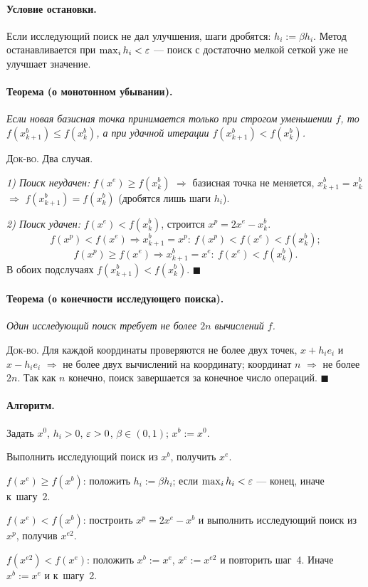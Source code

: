 \paragraph{Условие остановки.}
Если исследующий поиск не дал улучшения, шаги дробятся: $h_i := \beta h_i$.
Метод останавливается при $\max_i h_i < \varepsilon$ — поиск с достаточно мелкой
сеткой уже не улучшает значение.

\paragraph{Теорема (о монотонном убывании).}
\textit{Если новая базисная точка принимается только при строгом уменьшении
$f$, то $f(x^b_{k+1}) \le f(x^b_k)$, а при удачной итерации
$f(x^b_{k+1}) < f(x^b_k)$.}

\textsc{Док-во.} Два случая.

\emph{1) Поиск неудачен:} $f(x^e) \ge f(x^b_k)$ $\Rightarrow$ базисная точка
не меняется, $x^b_{k+1} = x^b_k$ $\Rightarrow$ $f(x^b_{k+1}) = f(x^b_k)$
(дробятся лишь шаги $h_i$).

\emph{2) Поиск удачен:} $f(x^e) < f(x^b_k)$, строится $x^p = 2x^e - x^b_k$.
\[
  f(x^p) < f(x^e) \Rightarrow x^b_{k+1} = x^p :\ f(x^p) < f(x^e) < f(x^b_k) ;
\]
\[
  f(x^p) \ge f(x^e) \Rightarrow x^b_{k+1} = x^e :\ f(x^e) < f(x^b_k) .
\]
В обоих подслучаях $f(x^b_{k+1}) < f(x^b_k)$. $\blacksquare$

\paragraph{Теорема (о конечности исследующего поиска).}
\textit{Один исследующий поиск требует не более $2n$ вычислений $f$.}

\textsc{Док-во.} Для каждой координаты проверяются не более двух точек,
$x + h_i e_i$ и $x - h_i e_i$ $\Rightarrow$ не более двух вычислений на
координату; координат $n$ $\Rightarrow$ не более $2n$. Так как $n$ конечно,
поиск завершается за конечное число операций. $\blacksquare$

\paragraph{Алгоритм.}
\begin{csteps}
  \item Задать $x^0$, $h_i > 0$, $\varepsilon > 0$, $\beta \in (0,1)$; $x^b := x^0$.
  \item Выполнить исследующий поиск из $x^b$, получить $x^e$.
  \item $f(x^e) \ge f(x^b)$: положить $h_i := \beta h_i$; если
        $\max_i h_i < \varepsilon$ — конец, иначе к~шагу~2.
  \item $f(x^e) < f(x^b)$: построить $x^p = 2x^e - x^b$ и выполнить
        исследующий поиск из $x^p$, получив $x^{e2}$.
  \item $f(x^{e2}) < f(x^e)$: положить $x^b := x^e$, $x^e := x^{e2}$ и
        повторить шаг~4. Иначе $x^b := x^e$ и к~шагу~2.
\end{csteps}

